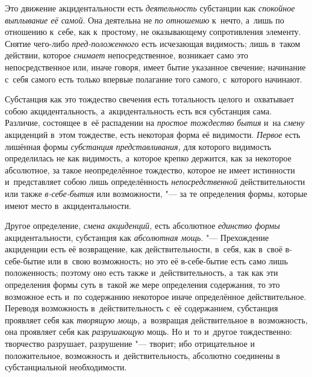 Это движение акцидентальности есть {\em деятельность}
субстанции как {\em спокойное выплывание её самой}. Она
деятельна не {\em по отношению} к~нечто, а~лишь по
отношению к~себе, как к~простому, не оказывающему сопротивления элементу.
Снятие чего-либо {\em пред-положенного} есть исчезающая
видимость; лишь в~таком действии, которое {\em снимает}
непосредственное, возникает само это непосредственное или, иначе говоря,
имеет бытие указанное свечение; начинание с~себя самого есть только впервые
полагание того самого, с~которого начинают.

Субстанция как это тождество свечения есть тотальность целого и~охватывает
собою акцидентальность, а~акцидентальность есть вся субстанция сама.
Различие, состоящее в~её распадении на {\em простое
тождество} {\em бытия} и~на
{\em смену} акциденций в~этом тождестве, есть некоторая
форма её видимости. {\em Первое} есть лишённая формы
{\em субстанция}
{\em представливания,} для которого видимость
определилась не как видимость, а~которое крепко держится, как за некоторое
абсолютное, за такое неопределённое тождество, которое не имеет истинности
и~представляет собою лишь определённость
{\em непосредственной} действительности или также
{\em в-себе-бытия} или возможности, "--- за те определения
формы, которые имеют место в~акцидентальности.

Другое определение, {\em смена акциденций,} есть
абсолютное {\em единство формы} акцидентальности,
субстанция как {\em абсолютная мощь}. "--- Прехождение
акциденции есть её возвращение, как действительности, в~себя, как в~своё
в-себе-бытие или в~свою возможность; но это её в-себе-бытие есть само лишь
положенность; поэтому оно есть также и~действительность, а~так как эти
определения формы суть в~такой же мере определения содержания, то это
возможное есть и~по содержанию некоторое иначе определённое действительное.
Переводя возможность в~действительность с~её содержанием, субстанция
проявляет себя как {\em творящую мощь,} а~возвращая
действительное в~возможность, она проявляет себя как
{\em разрушающую} мощь. Но и~то и~другое тождественно:
творчество разрушает, разрушение "--- творит; ибо отрицательное и
положительное, возможность и~действительность, абсолютно соединены в
субстанциальной необходимости.

